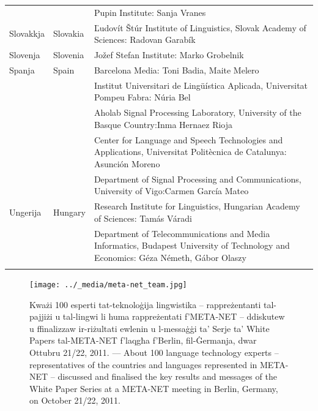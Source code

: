 \documentclass[]{../../metanetpaper}
\begin{document}
\begin{longtable}{@{}llp{113mm}@{}}
  & & Pupin Institute: Sanja Vranes \\ \addlinespace  
  Slovakkja & \textcolor{grey1}{Slovakia} & Ľudovít Štúr Institute of Linguistics, Slovak Academy of Sciences: Radovan Garabík \\ \addlinespace 
  Slovenja & \textcolor{grey1}{Slovenia} & Jožef Stefan Institute: Marko Grobelnik \\ \addlinespace 
  Spanja & \textcolor{grey1}{Spain} & Barcelona Media: Toni Badia, Maite Melero \\ \addlinespace 
  & & Institut Universitari de Lingüística Aplicada, Universitat Pompeu Fabra: Núria Bel \\ \addlinespace 
  & & Aholab Signal Processing Laboratory, University of the Basque Country:\newline Inma Hernaez Rioja \\ \addlinespace 
  & & Center for Language and Speech Technologies and Applications, Universitat Politècnica de Catalunya:  Asunción Moreno \\ \addlinespace 
  & & Department of Signal Processing and Communications, University of Vigo:\newline Carmen García Mateo \\ \addlinespace 
  Ungerija & \textcolor{grey1}{Hungary} & Research Institute for Linguistics, Hungarian Academy of Sciences: Tamás Váradi\\  \addlinespace
  & & Department of Telecommunications and Media Informatics, Budapest University of Technology and Economics: Géza Németh, Gábor Olaszy\\ \addlinespace
\end{longtable}
\normalsize


\renewcommand*{\figureformat}{}
\renewcommand*{\captionformat}{}

\begin{figure}[htbp]
  \center
 \texttt{[image: ../\_media/meta-net\_team.jpg]}
 \caption{Kważi 100 esperti tat-teknoloġija lingwistika -- rappreżentanti tal-pajjiżi u tal-lingwi li huma rappreżentati f'META-NET -- ddiskutew u ffinalizzaw ir-riżultati ewlenin u l-messaġġi ta' Serje ta’ White Papers tal-META-NET f'laqgħa f'Berlin, fil-Ġermanja, dwar Ottubru 21/22, 2011. --- \textcolor{grey1}{About 100 language technology experts -- representatives of the countries and languages represented in META-NET -- discussed and finalised the key results and messages of the White Paper Series at a META-NET meeting in Berlin, Germany, on October 21/22, 2011.}}
  \medskip
\end{figure}
\end{document}
